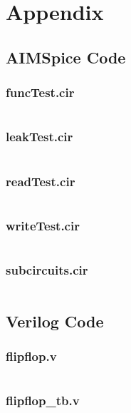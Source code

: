 \section{Appendix} \label{sec:07:appendix}

\subsection{AIMSpice Code}    

\subsubsection*{funcTest.cir}
\inputminted{text}{../aimSpice/funcTest.cir}

\subsubsection*{leakTest.cir}
\inputminted{text}{../aimSpice/leakTest.cir}

\subsubsection*{readTest.cir}
\inputminted{text}{../aimSpice/readTest.cir}

\subsubsection*{writeTest.cir}
\inputminted{text}{../aimSpice/writeTest.cir}

\subsubsection*{subcircuits.cir}
\inputminted{text}{../aimSpice/subcircuits.cir}

\subsection{Verilog Code}

\subsubsection*{flipflop.v}
\inputminted{verilog}{../verilog_mem8x8_m_tri_state_buffer/flipflop.v}

\subsubsection*{flipflop\_tb.v}
\inputminted{verilog}{../verilog_mem8x8_m_tri_state_buffer/flipflop_tb.v}

